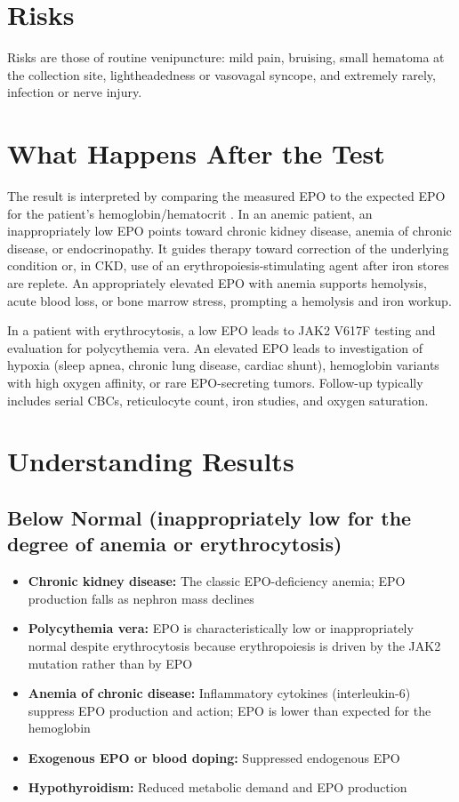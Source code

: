 \section*{Risks}
Risks are those of routine venipuncture: mild pain, bruising, small hematoma at the collection site, lightheadedness or vasovagal syncope, and extremely rarely, infection or nerve injury.

\section*{What Happens After the Test}
The result is interpreted by comparing the measured EPO to the expected EPO for the patient's hemoglobin/hematocrit \cite{kaushansky2021williams}. In an anemic patient, an inappropriately low EPO points toward chronic kidney disease, anemia of chronic disease, or endocrinopathy. It guides therapy toward correction of the underlying condition or, in CKD, use of an erythropoiesis-stimulating agent after iron stores are replete. An appropriately elevated EPO with anemia supports hemolysis, acute blood loss, or bone marrow stress, prompting a hemolysis and iron workup.

In a patient with erythrocytosis, a low EPO leads to JAK2 V617F testing and evaluation for polycythemia vera. An elevated EPO leads to investigation of hypoxia (sleep apnea, chronic lung disease, cardiac shunt), hemoglobin variants with high oxygen affinity, or rare EPO-secreting tumors. Follow-up typically includes serial CBCs, reticulocyte count, iron studies, and oxygen saturation.

\section*{Understanding Results}

\subsection*{Below Normal (inappropriately low for the degree of anemia or erythrocytosis)}
\begin{itemize}
  \item \textbf{Chronic kidney disease:} The classic EPO-deficiency anemia; EPO production falls as nephron mass declines
  \item \textbf{Polycythemia vera:} EPO is characteristically low or inappropriately normal despite erythrocytosis because erythropoiesis is driven by the JAK2 mutation rather than by EPO
  \item \textbf{Anemia of chronic disease:} Inflammatory cytokines (interleukin-6) suppress EPO production and action; EPO is lower than expected for the hemoglobin
  \item \textbf{Exogenous EPO or blood doping:} Suppressed endogenous EPO
  \item \textbf{Hypothyroidism:} Reduced metabolic demand and EPO production
\end{itemize}

